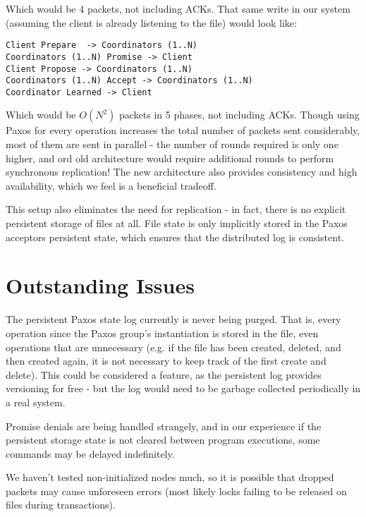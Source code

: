 \documentclass[11pt]{article}
\begin{document}
Which would be 4 packets, not including ACKs.
That same write in our system (assuming the client is already listening to the file) would look like:

\begin{verbatim}
Client Prepare  -> Coordinators (1..N)
Coordinators (1..N) Promise -> Client
Client Propose -> Coordinators (1..N)
Coordinators (1..N) Accept -> Coordinators (1..N)
Coordinator Learned -> Client
\end{verbatim}

Which would be $O(N^2)$ packets in 5 phases, not including ACKs.
Though using Paxos for every operation increases the total number of packets sent considerably, most of them are sent in parallel -
the number of rounds required is only one higher, and ord old architecture would require additional rounds to perform synchronous replication! 
The new architecture also provides consistency and high availability, which we feel is a beneficial tradeoff.

This setup also eliminates the need for replication - in fact, there is no explicit persistent storage of files at all. 
File state is only implicitly stored in the Paxos acceptors persistent state, which ensures that the distributed log is consistent.

\section{Outstanding Issues}

The persistent Paxos state log currently is never being purged.
That is, every operation since the Paxos group's instantiation is stored in the file, even operations that are unnecessary (e.g. if the file has been created, deleted, and then created again, it is not necessary to keep track of the first create and delete).
This could be considered a feature, as the persistent log provides versioning for free - but the log would need to be garbage collected periodically in a real system.

Promise denials are being handled strangely, and in our experience if the persistent storage state is not cleared between program executions, some commands may be delayed indefinitely.

We haven't tested non-initialized nodes much, so it is possible that dropped packets may cause unforeseen errors (most likely locks failing to be released on files during transactions).
\end{document}

